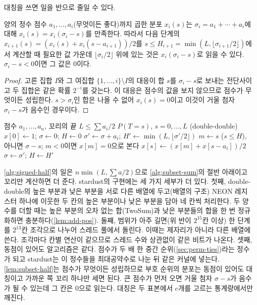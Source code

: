 대칭을 쓰면 일을 반으로 줄일 수 있다.

\begin{lemma}
\label{lem:subset-half}
양의 정수 점수 $a_1,\dots,a_i$(무엇이든 좋다)까지 곱한 분포 $x_i(s)$는 $\sigma_i=a_1+\cdots+a_i$에 대해 $x_i(s)=x_i(\sigma_i-s)$를 만족한다. 따라서 다음 단계의 $x_{i+1}(s)=(x_i(s)+x_i(s-a_{i+1}))/2$를 $s\le H_{i+1}=\min(L,\lfloor\sigma_{i+1}/2\rfloor)$에서 계산할 때 필요한 값 가운데 $\lfloor\sigma_i/2\rfloor$ 위에 있는 것은 $x_i(\sigma_i-s)$로 읽을 수 있다. $\sigma_i-s<0$이면 그 값은 $0$이다.
\end{lemma}

\begin{proof}
고른 집합 $I$와 그 여집합 $\{1,\dots,i\}\setminus I$의 대응이 합 $s$를 $\sigma_i-s$로 보내는 전단사이고 두 집합은 같은 확률 $2^{-i}$를 갖는다. 이 대응은 점수의 값을 보지 않으므로 점수가 무엇이든 성립한다. $s>\sigma_i$인 합은 나올 수 없어 $x_i(s)=0$이고 이것이 거울 첨자 $\sigma_i-s$가 음수인 경우이다.
\end{proof}

\begin{algorithm}[htbp]
\begin{algorithmic}[1]
\Require 점수 $a_1,\dots,a_n$, 꼬리의 끝 $L\le\sum a_i/2$
\Ensure $P(T=s)$, $s=0,\dots,L$ (double-double)
\State $x[0]\gets1$; $\sigma\gets0$; $H\gets0$
  \State $\sigma'\gets\sigma+a_i$; $H'\gets\min(L,\lfloor\sigma'/2\rfloor)$
   
    \State $m\gets s$ ($s\le H$), 아니면 $\sigma-s$; $m<0$이면 $x[m]=0$으로 본다 
    \State $x[s]\gets(x[m]+x[s-a_i])/2$ 
  \EndFor
  \State $\sigma\gets\sigma'$; $H\gets H'$
\EndFor
\end{algorithmic}
\caption{부호 순위 분포의 아래쪽 반 (stardust 의 )}
\label{alg:signed-half}
\end{algorithm}

\cref{alg:signed-half}의 일은 $n\min(L,\sum a/2)$으로 \cref{alg:subset-sum}의 절반 아래이고 꼬리만 계산하면 더 준다. stardust의 구현에는 세 가지 세부가 더 있다. 첫째, double-double의 높은 부분과 낮은 부분을 서로 다른 배열에 두고(배열의 구조) NEON 레지스터 하나에 이웃한 두 칸의 높은 부분이나 낮은 부분을 담아 네 칸씩 처리한다. 두 양수를 더할 때는 높은 부분의 오차 없는 합(TwoSum)과 낮은 부분들의 합을 한 번 정규화하면 충분하다(\cref{lem:add-pos}). 둘째, 범위가 아주 길면(위 반이 $2^{15}$칸 이상) 한 단계를 $2^{13}$칸 조각으로 나누어 스레드 풀에서 돌린다. 이때는 제자리가 아니라 다른 배열에 쓴다. 조각마다 칸별 연산이 같으므로 스레드 수와 상관없이 같은 비트가 나온다. 셋째, 동점이 있어도 알고리즘은 같다. 점수가 두 배 한 중간 순위(\cref{sec:perm-ties})라는 정수가 되고 stardust는 이 정수들을 최대공약수로 나눈 뒤 같은 커널에 넣는다. \cref{lem:subset-half}는 점수가 무엇이든 성립하므로 부호 순위의 분포는 동점이 있어도 대칭이고 가까운 쪽 꼬리 하나만 세면 된다. 큰 점수가 먼저 오면 거울 첨자 $\sigma-s$가 음수가 될 수 있는데 그 칸은 $0$으로 읽는다. 대칭은 두 표본에서 $c$개를 고르는 통계량에서만 깨진다.

